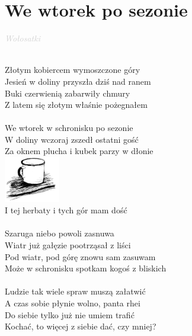 \documentclass[a5paper, 10pt]{book}
\begin{document}
\section{We wtorek po sezonie}\textcolor{lightgray}{\textit{Wołosatki}}\\~\\
\begin{minipage}[t]{0.7\textwidth}
  Złotym kobiercem wymoszczone góry\\
  Jesień w doliny przyszła dziś nad ranem\\
  Buki czerwienią zabarwiły chmury\\
  Z latem się złotym właśnie pożegnałem\\
  \\
  \hspace*{5mm}We wtorek w schronisku po sezonie\\
  \hspace*{5mm}W doliny wczoraj zszedł ostatni gość\\
  \hspace*{5mm}Za oknem plucha i kubek parzy w dłonie\\
  \includegraphics[height=2cm, right]{we_wtorek_po_sezonie.png}\vspace*{-2.1cm}\\
  \hspace*{5mm}I tej herbaty i tych gór mam dość\\
  \\
  Szaruga niebo powoli zasnuwa\\
  Wiatr już gałęzie pootrząsał z liści\\
  Pod wiatr, pod górę znowu sam zasuwam\\
  Może w schronisku spotkam kogoś z bliskich\\
  \\
  Ludzie tak wiele spraw muszą załatwić\\
  A czas sobie płynie wolno, panta rhei\\
  Do siebie tylko już nie umiem trafić\\
  Kochać, to więcej z siebie dać, czy mniej?\\
\end{minipage}
\end{document}
